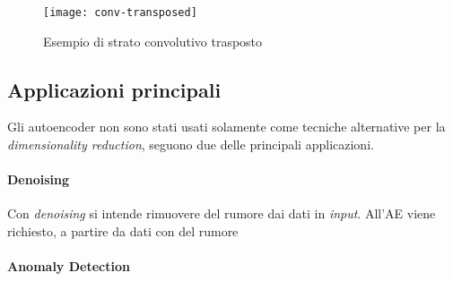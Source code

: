 \begin{figure}[ht]
  \begin{center}
    \texttt{[image: conv-transposed]}
    \caption{Esempio di strato convolutivo trasposto}
    \label{fig:conv-transposed}
  \end{center}
\end{figure}

\clearpage
\subsection{Applicazioni principali}
Gli autoencoder non sono stati usati solamente come tecniche alternative per la \textit{dimensionality reduction}, seguono due delle principali applicazioni.

\paragraph{Denoising}
Con \textit{denoising} si intende rimuovere del rumore dai dati in \textit{input}.
All'AE viene richiesto, a partire da dati con del rumore



\paragraph{Anomaly Detection}


\clearpage
{}
